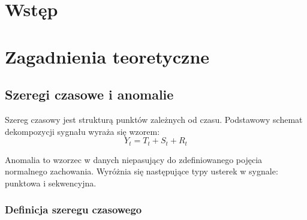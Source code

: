 \documentclass[a4paper,twoside,12pt]{book}
\newcounter{stronyPozaNumeracja}
\begin{document}
	
	
	
	\tableofcontents
	
	\setcounter{stronyPozaNumeracja}{\value{page}}
	\mainmatter
	\pagestyle{empty}
	
	\cleardoublepage
	
	\pagestyle{NumeryStronNazwyRozdzialow}
	
	
	\chapter{Wstęp}
	
	
	
	
	\chapter{Zagadnienia teoretyczne}
	
	\section{Szeregi czasowe i anomalie}
	Szereg czasowy jest strukturą punktów zależnych od czasu. Podstawowy schemat dekompozycji sygnału wyraża się wzorem:
	\begin{equation}
		Y_t = T_t + S_t + R_t
	\end{equation}
	
	Anomalia to wzorzec w danych niepasujący do zdefiniowanego pojęcia normalnego zachowania. Wyróżnia się następujące typy usterek w sygnale: punktowa i sekwencyjna.
	\subsection{Definicja szeregu czasowego}
\end{document}
